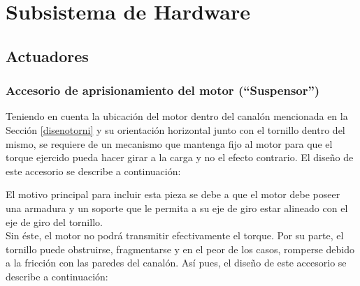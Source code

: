 \section{Subsistema de Hardware} \label{subsissen}

\subsection{Actuadores}
\subsubsection{Accesorio de aprisionamiento del motor (``Suspensor'')}

Teniendo en cuenta la ubicación del motor dentro del canalón mencionada en la Sección \ref{disenotorni} y su orientación horizontal junto con el tornillo dentro del mismo, se requiere de un mecanismo que mantenga fijo al motor para que el torque ejercido pueda hacer girar a la carga y no el efecto contrario. El diseño de este accesorio se describe a continuación:

El motivo principal para incluir esta pieza se debe a que el motor debe poseer una armadura y un soporte que le permita a su eje de giro estar alineado con el eje de giro del tornillo.\\
Sin éste, el motor no podrá transmitir efectivamente el torque. Por su parte, el tornillo puede obstruirse, fragmentarse y en el peor de los casos, romperse debido a la fricción con las paredes del canalón. Así pues, el diseño de este accesorio se describe a continuación:

